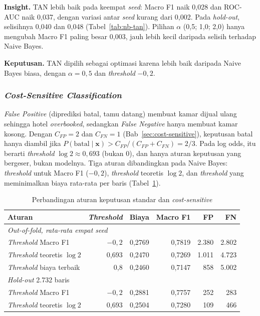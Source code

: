 {\small
\textbf{Insight.} TAN lebih baik pada keempat \textit{seed}: Macro F1 naik 0,028 dan ROC-AUC naik 0,037, dengan variasi antar \textit{seed} kurang dari 0,002. Pada \textit{hold-out}, selisihnya 0,040 dan 0,048 (Tabel~\ref{tab:nb-tan}). Pilihan $\alpha$ (0,5; 1,0; 2,0) hanya mengubah Macro F1 paling besar 0,003, jauh lebih kecil daripada selisih terhadap Naive Bayes.
\par\smallskip
\textbf{Keputusan.} TAN dipilih sebagai optimasi karena lebih baik daripada Naive Bayes biasa, dengan $\alpha = 0{,}5$ dan \textit{threshold} $-0{,}2$.\par}

\subsubsection{\textit{Cost-Sensitive Classification}}
\textit{False Positive} (diprediksi batal, tamu datang) membuat kamar dijual ulang sehingga hotel \textit{overbooked}, sedangkan \textit{False Negative} hanya membuat kamar kosong. Dengan $C_{FP} = 2$ dan $C_{FN} = 1$ (Bab~\ref{sec:cost-sensitive}), keputusan batal hanya diambil jika $P(\text{batal} \mid \mathbf{x}) > C_{FP}/(C_{FP} + C_{FN}) = 2/3$. Pada log odds, itu berarti \textit{threshold} $\log 2 \approx 0{,}693$ (bukan 0), dan hanya aturan keputusan yang bergeser, bukan modelnya. Tiga aturan dibandingkan pada Naive Bayes: \textit{threshold} untuk Macro F1 ($-0{,}2$), \textit{threshold} teoretis $\log 2$, dan \textit{threshold} yang meminimalkan biaya rata-rata per baris (Tabel~\ref{tab:nb-cost}).


\begin{table}[H]
	\centering
	\caption{Perbandingan aturan keputusan standar dan \textit{cost-sensitive}}
	\label{tab:nb-cost}
	\begin{tabular}{l r r r r r}
		\toprule
		\textbf{Aturan} & \textbf{\textit{Threshold}} & \textbf{Biaya} & \textbf{Macro F1} & \textbf{FP} & \textbf{FN} \\
		\midrule
		\multicolumn{6}{l}{\textit{Out-of-fold, rata-rata empat \textit{seed}}} \\
		\textit{Threshold} Macro F1 & $-0{,}2$ & 0,2769 & 0,7819 & 2.380 & 2.802 \\
		\textit{Threshold} teoretis $\log 2$ & 0,693 & 0,2470 & 0,7269 & 1.011 & 4.723 \\
		\textit{Threshold} biaya terbaik & 0,8 & 0,2460 & 0,7147 & 858 & 5.002 \\
		\midrule
		\multicolumn{6}{l}{\textit{Hold-out} 2.732 baris} \\
		\textit{Threshold} Macro F1 & $-0{,}2$ & 0,2881 & 0,7757 & 252 & 283 \\
		\textit{Threshold} teoretis $\log 2$ & 0,693 & 0,2504 & 0,7280 & 109 & 466 \\
		\bottomrule
	\end{tabular}
\end{table}


